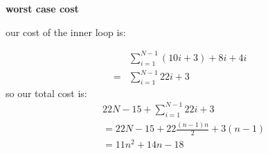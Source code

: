 \documentclass{article}
\begin{document}
\textbf{worst case cost}

our cost of the inner loop is:

\begin{align*}
&\sum_{i=1}^{N-1} (10i + 3) + 8i + 4i\\
=&\sum_{i=1}^{N-1} 22i + 3
\end{align*}
so our total cost is:
\begin{align*}
& 22N - 15 + \sum_{i=1}^{N-1} 22i + 3\\
&= 22N - 15 + 22\frac{(n-1)n}{2} + 3 (n-1)\\
&= 11n^2 + 14n - 18
\end{align*}
\end{document}
